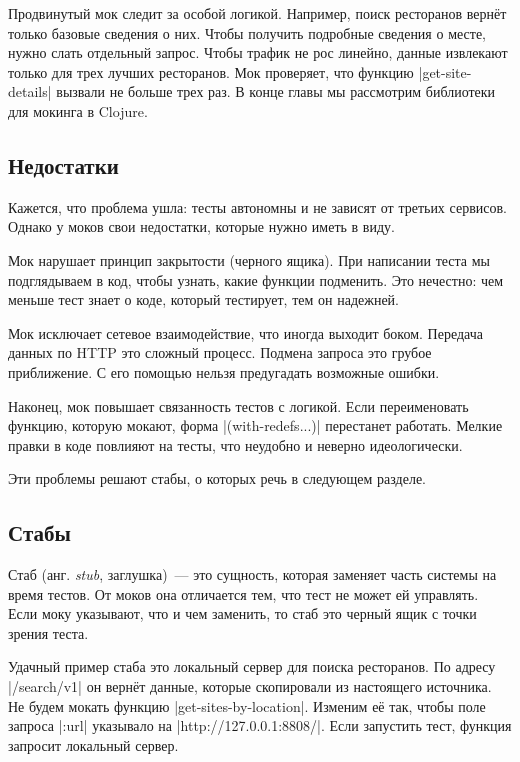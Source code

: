 Продвинутый мок следит за особой логикой. Например, поиск ресторанов верн\"{е}т
только базовые сведения о них. Чтобы получить подробные сведения о месте, нужно
слать отдельный запрос. Чтобы трафик не рос линейно, данные извлекают только для
трех лучших ресторанов. Мок проверяет, что функцию \spverb|get-site-details|
вызвали не больше трех раз. В конце главы мы рассмотрим библиотеки для мокинга в
Clojure.

\subsection{Недостатки}

Кажется, что проблема ушла: тесты автономны и не зависят от третьих
сервисов. Однако у моков свои недостатки, которые нужно иметь в виду.

Мок нарушает принцип закрытости (черного ящика). При написании теста мы
подглядываем в код, чтобы узнать, какие функции подменить. Это нечестно: чем
меньше тест знает о коде, который тестирует, тем он надежней.

Мок исключает сетевое взаимодействие, что иногда выходит боком. Передача данных
по HTTP это сложный процесс. Подмена запроса это грубое приближение. С его
помощью нельзя предугадать возможные ошибки.

Наконец, мок повышает связанность тестов с логикой. Если переименовать функцию,
которую мокают, форма \spverb|(with-redefs...)| перестанет работать. Мелкие
правки в коде повлияют на тесты, что неудобно и неверно идеологически.

Эти проблемы решают стабы, о которых речь в следующем разделе.

\subsection{Стабы}


Стаб (анг. \emph{stub}, заглушка)~--- это сущность, которая заменяет часть
системы на время тестов. От моков она отличается тем, что тест не может ей
управлять. Если моку указывают, что и чем заменить, то стаб это черный ящик с
точки зрения теста.

Удачный пример стаба это локальный сервер для поиска ресторанов. По адресу
\spverb|/search/v1| он верн\"{е}т данные, которые скопировали из настоящего
источника. Не будем мокать функцию \spverb|get-sites-by-location|. Изменим е\"{е}
так, чтобы поле запроса \spverb|:url| указывало на
\spverb|http://127.0.0.1:8808/|.  Если запустить тест, функция запросит
локальный сервер.

